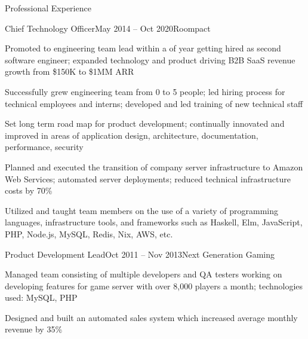 \documentclass{resume} %
\begin{document}
\begin{rSection}{Professional Experience}
\begin{rSubsection}{Chief Technology Officer}{May 2014 -- Oct 2020}{Roompact}{}
  \item Promoted to engineering team lead within a of year getting hired as second software engineer; expanded technology and product driving B2B SaaS revenue growth from \$150K to \$1MM ARR
  \item Successfully grew engineering team from 0 to 5 people; led hiring process for technical employees and interns; developed and led training of new technical staff
  \item Set long term road map for product development; continually innovated and improved in areas of application design, architecture, documentation, performance, security
  \item Planned and executed the transition of company server infrastructure to Amazon Web Services; automated server deployments; reduced technical infrastructure costs by 70\%
  \item Utilized and taught team members on the use of a variety of programming languages, infrastructure tools, and frameworks such as Haskell, Elm, JavaScript, PHP, Node.js, MySQL, Redis, Nix, AWS, etc.
\end{rSubsection}


\begin{rSubsection}{Product Development Lead}{Oct 2011 -- Nov 2013}{Next Generation Gaming}{}
  \item Managed team consisting of multiple developers and QA testers working on developing features for game server with over 8,000 players a month; technologies used: MySQL, PHP
  \item Designed and built an automated sales system which increased average monthly revenue by 35\%
\end{rSubsection}

\end{rSection}

\end{document}
